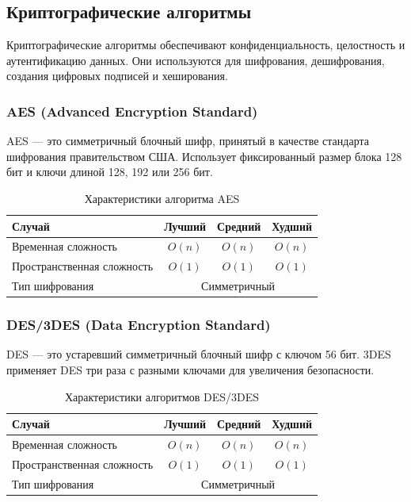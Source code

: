 \documentclass[a4paper,12pt]{article}
\begin{document}
\subsection{Криптографические алгоритмы}
\label{subsec:криптографические-алгоритмы}

Криптографические алгоритмы обеспечивают конфиденциальность, целостность и аутентификацию данных. Они используются для шифрования, дешифрования, создания цифровых подписей и хеширования.

\subsubsection{AES (Advanced Encryption Standard)}
\label{subsubsec:aes-advanced-encryption-standard}

AES --- это симметричный блочный шифр, принятый в качестве стандарта шифрования правительством США. Использует фиксированный размер блока 128 бит и ключи длиной 128, 192 или 256 бит.

\begin{table}[H]
    \centering
    \begin{tabular}{|l|c|c|c|}
        \hline
        Случай & Лучший & Средний & Худший \\
        \hline
        Временная сложность & $O(n)$ & $O(n)$ & $O(n)$ \\
        \hline
        Пространственная сложность & $O(1)$ & $O(1)$ & $O(1)$ \\
        \hline
        Тип шифрования & \multicolumn{3}{c|}{Симметричный} \\
        \hline
    \end{tabular}
    \caption{Характеристики алгоритма AES}
\end{table}

\subsubsection{DES/3DES (Data Encryption Standard)}
\label{subsubsec:des-3des-data-encryption-standard}

DES --- это устаревший симметричный блочный шифр с ключом 56 бит. 3DES применяет DES три раза с разными ключами для увеличения безопасности.

\begin{table}[H]
    \centering
    \begin{tabular}{|l|c|c|c|}
        \hline
        Случай & Лучший & Средний & Худший \\
        \hline
        Временная сложность & $O(n)$ & $O(n)$ & $O(n)$ \\
        \hline
        Пространственная сложность & $O(1)$ & $O(1)$ & $O(1)$ \\
        \hline
        Тип шифрования & \multicolumn{3}{c|}{Симметричный} \\
        \hline
    \end{tabular}
    \caption{Характеристики алгоритмов DES/3DES}
\end{table}
\end{document}
